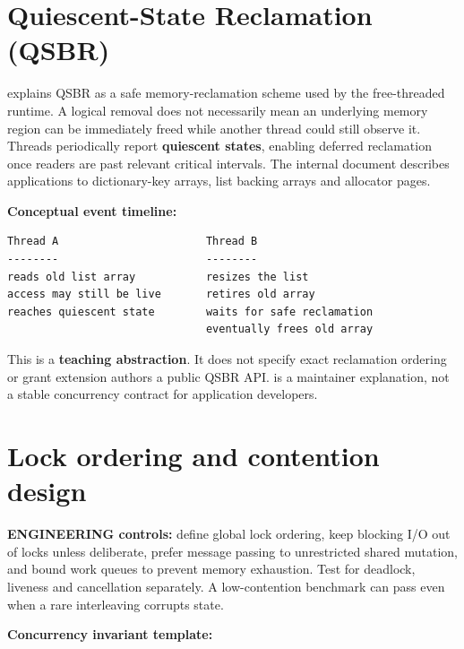 \documentclass[
  11pt,
]{report}
\begin{document}
\chapter{Quiescent-State Reclamation
(QSBR)}\label{quiescent-state-reclamation-qsbr}

 explains QSBR as a safe
memory-reclamation scheme used by the free-threaded runtime. A logical
removal does not necessarily mean an underlying memory region can be
immediately freed while another thread could still observe it. Threads
periodically report \textbf{quiescent states}, enabling deferred
reclamation once readers are past relevant critical intervals. The
internal document describes applications to dictionary-key arrays, list
backing arrays and allocator pages.

\textbf{Conceptual event timeline:}

\begin{lstlisting}
Thread A                       Thread B
--------                       --------
reads old list array           resizes the list
access may still be live       retires old array
reaches quiescent state        waits for safe reclamation
                               eventually frees old array
\end{lstlisting}

This is a \textbf{teaching abstraction}. It does not specify exact
reclamation ordering or grant extension authors a public QSBR API.
 is a maintainer
explanation, not a stable concurrency contract for application
developers.

\chapter{Lock ordering and contention
design}\label{lock-ordering-and-contention-design}

\textbf{ENGINEERING controls:} define global lock ordering, keep
blocking I/O out of locks unless deliberate, prefer message passing to
unrestricted shared mutation, and bound work queues to prevent memory
exhaustion. Test for deadlock, liveness and cancellation separately. A
low-contention benchmark can pass even when a rare interleaving corrupts
state.

\textbf{Concurrency invariant template:}
\end{document}
